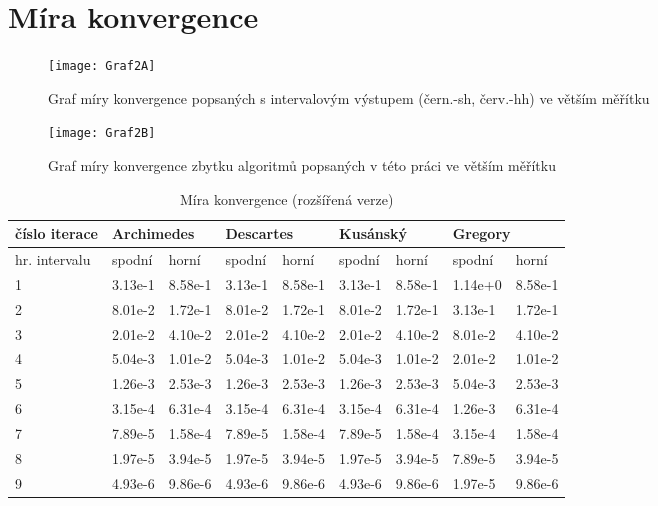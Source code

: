 \documentclass[soc]{gzwroc} %
\begin{document}
\section{Míra konvergence} %
\begin{figure}[!ht]
\texttt{[image: Graf2A]}
\caption{Graf míry konvergence popsaných s intervalovým výstupem (čern.-sh, červ.-hh) ve větším měřítku}
\label{fig:graf1}
\end{figure}
\begin{figure}[!ht]
\texttt{[image: Graf2B]}
\caption{Graf míry konvergence zbytku algoritmů popsaných v této práci ve větším měřítku}
\label{fig:graf1}
\end{figure}
\begin{table}[h!]
\caption{Míra konvergence (rozšířená verze)}
\begin{tabular}{|l|l|l|l|l|l|l|l|l|}
\hline
\multicolumn{1}{|l|}{\bfseries číslo iterace} & \multicolumn{2}{l|}{\bfseries Archimedes} & \multicolumn{2}{l|}{\bfseries Descartes} & \multicolumn{2}{l|}{\bfseries Kusánský} & \multicolumn{2}{l|}{\bfseries Gregory}  \\ \hline
\multicolumn{1}{|l|}{hr. intervalu} & \multicolumn{1}{l|}{spodní} & \multicolumn{1}{l|}{horní} & \multicolumn{1}{l|}{spodní} & \multicolumn{1}{l|}{horní} & \multicolumn{1}{l|}{spodní} & \multicolumn{1}{l|}{horní} & \multicolumn{1}{l|}{spodní} & \multicolumn{1}{l|}{horní} \\ \hline \hline
1 & 3.13e-1 & 8.58e-1 & 3.13e-1 & 8.58e-1 & 3.13e-1 & 8.58e-1 & 1.14e+0 & 8.58e-1 \\ \hline 
2 & 8.01e-2 & 1.72e-1 & 8.01e-2 & 1.72e-1 & 8.01e-2 & 1.72e-1 & 3.13e-1 & 1.72e-1 \\ \hline 
3 & 2.01e-2 & 4.10e-2 & 2.01e-2 & 4.10e-2 & 2.01e-2 & 4.10e-2 & 8.01e-2 & 4.10e-2 \\ \hline 
4 & 5.04e-3 & 1.01e-2 & 5.04e-3 & 1.01e-2 & 5.04e-3 & 1.01e-2 & 2.01e-2 & 1.01e-2 \\ \hline 
5 & 1.26e-3 & 2.53e-3 & 1.26e-3 & 2.53e-3 & 1.26e-3 & 2.53e-3 & 5.04e-3 & 2.53e-3 \\ \hline 
6 & 3.15e-4 & 6.31e-4 & 3.15e-4 & 6.31e-4 & 3.15e-4 & 6.31e-4 & 1.26e-3 & 6.31e-4 \\ \hline 
7 & 7.89e-5 & 1.58e-4 & 7.89e-5 & 1.58e-4 & 7.89e-5 & 1.58e-4 & 3.15e-4 & 1.58e-4 \\ \hline 
8 & 1.97e-5 & 3.94e-5 & 1.97e-5 & 3.94e-5 & 1.97e-5 & 3.94e-5 & 7.89e-5 & 3.94e-5 \\ \hline 
9 & 4.93e-6 & 9.86e-6 & 4.93e-6 & 9.86e-6 & 4.93e-6 & 9.86e-6 & 1.97e-5 & 9.86e-6 \\ \hline 

\end{tabular}
\end{table}
\end{document}

